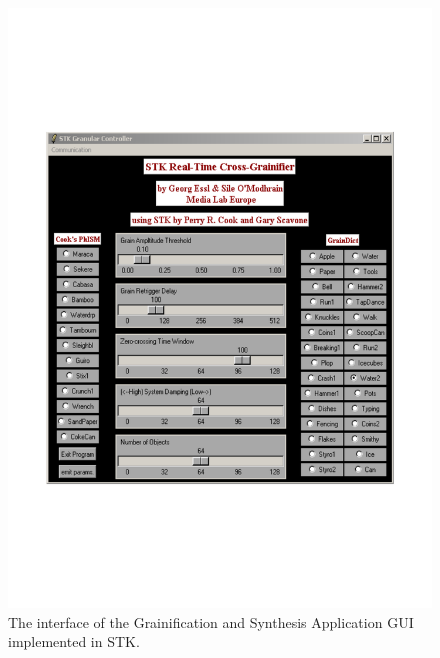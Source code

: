 \begin{figure}[t]
\centering
\includegraphics[width=\textwidth]{STKWindow3f-eps-converted-to.pdf}
\caption{The interface of the Grainification and Synthesis Application GUI implemented in STK.}
\label{Omodhrain:fig:stkgui}
\end{figure}



